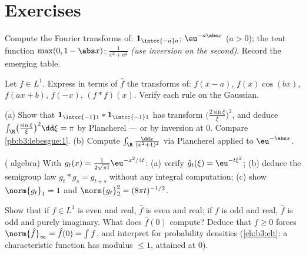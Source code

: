 \section{Exercises}

\begin{exercise}[$\star$]\label{exo:b3:fouriertransform:1}
Compute the Fourier transforms of: $\mathbf 1_{\intcc{-a}a}$;
$\eu^{-a\abs x}$ ($a > 0$); the tent function $\max(0, 1 -
\abs x)$; $\frac1{x^2 + a^2}$ \emph{(use inversion on the
second)}. Record the emerging table.
\end{exercise}

\begin{exercise}[$\star$]\label{exo:b3:fouriertransform:2}
Let $f \in L^1$. Express in terms of $\hat f$ the transforms
of: $f(x - a)$, $f(x)\cos(bx)$, $f(ax + b)$,
$\overline{f(-x)}$, $(f * f)(x)$. Verify each rule on the
Gaussian.
\end{exercise}

\begin{exercise}[$\star\star$]\label{exo:b3:fouriertransform:3}
(a) Show that $\mathbf 1_{\intcc{-1}1} * \mathbf
1_{\intcc{-1}1}$ has transform $\bigl(\frac{2\sin\xi}\xi
\bigr)^2$, and deduce
$\int_\R\bigl(\frac{\sin\xi}\xi\bigr)^2\dd\xi = \pi$ by
Plancherel --- or by inversion at $0$. Compare
\cref{pb:b3:lebesgue:1}.
(b) Compute $\int_\R\frac{\dd x}{(x^2+1)^2}$ via Plancherel
applied to $\eu^{-\abs x}$.
\end{exercise}

\begin{exercise}[$\star\star$]\label{exo:b3:fouriertransform:4}
( algebra) With $g_t(x) =
\frac1{2\sqrt{\pi t}}\eu^{-x^2/4t}$:
(a) verify $\hat g_t(\xi) = \eu^{-t\xi^2}$;
(b) deduce the semigroup law $g_t * g_s = g_{t+s}$ without any
integral computation;
(c) show $\norm{g_t}_1 = 1$ and $\norm{g_t}_2^2 =
(8\pi t)^{-1/2}$.
\end{exercise}

\begin{exercise}[$\star\star$]\label{exo:b3:fouriertransform:5}
Show that if $f \in L^1$ is even and real, $\hat f$ is even
and real; if $f$ is odd and real, $\hat f$ is odd and purely
imaginary. What does $\hat f(0)$ compute? Deduce that $f \geq
0$ forces $\norm{\hat f}_\infty = \hat f(0) = \int f$, and
interpret for probability densities (\cref{ch:b3:clt}: a
characteristic function has modulus $\leq 1$, attained at
$0$).
\end{exercise}

